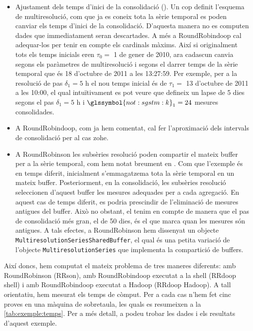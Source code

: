 \begin{itemize}
\item Ajustament dels temps d'inici de la consolidació
  (). Un cop definit l'esquema
  de multiresolució, com que ja es coneix tota la sèrie temporal es
  poden canviar els temps d'inici de la consolidació. D'aquesta manera
  no es computen dades que immediatament seran descartades. A més a
  RoundRobindoop cal adequar-los per tenir en compte els cardinals
  màxims. Així si originalment tots els temps inicials eren $\tau_0=$
  1 de gener de 2010, ara cadascun canvia segons els paràmetres de
  multiresolució i segons el darrer temps de la sèrie temporal que és
  18 d'octubre de 2011 a les 13:27:59. Per exemple, per a la resolució
  de pas $\delta_1=5 \text{ h}$ el nou temps inicial és de $\tau_1=$
  13 d'octubre de 2011 a les 10:00, el qual intuïtivament es pot veure
  que defineix un lapse de 5 dies segons el pas $\delta_1=5 \text{ h}$
  i $\glssymbol{not:sgstm:k}_1=24$ mesures consolidades.


\item A RoundRobindoop, com ja hem comentat, cal fer l'aproximació
  dels intervals de consolidació per al cas \gls{zohe}.


\item A RoundRobinson les subsèries resolució poden compartir el
  mateix buffer per a la sèrie temporal, com hem notat breument en
  . Com que l'exemple és
  en temps diferit, inicialment s'emmagatzema tota la sèrie temporal
  en un mateix buffer. Posteriorment, en la consolidació, les
  subsèries resolució seleccionen d'aquest buffer les mesures
  adequades per a cada agregació. En aquest cas de temps diferit, es
  podria prescindir de l'eliminació de mesures antigues del
  buffer. Això no obstant, el tenim en compte de manera que el pas de
  consolidació més gran, el de 50 dies, és el que marca quan les
  mesures són antigues. A tals efectes, a RoundRobinson hem dissenyat
  un objecte \lstinline[style=py]+MultiresolutionSeriesSharedBuffer+,
  el qual és una petita variació de l'objecte
  \lstinline[style=py]+MultiresolutionSeries+ que implementa la
  compartició de buffers.

\end{itemize}




Així doncs, hem computat el mateix problema de tres maneres diferents:
amb RoundRobinson (RRson), amb RoundRobindoop executat a la shell
(RRdoop shell) i amb RoundRobindoop executat a Hadoop (RRdoop
Hadoop). A tall orientatiu, hem mesurat els temps de còmput. Per a cada
cas n'hem fet cinc proves en una màquina de sobretaula, les
quals es resumeixen a la \autoref{tab:exemple:temps}. 
%
Per a més detall, a
 \cite[\url{http://escriny.epsem.upc.edu/svn/rrb/src/experiments/tags/isense-2014-tesi/}]{llusa:implementacions}
podeu trobar les dades i els resultats d'aquest exemple.


